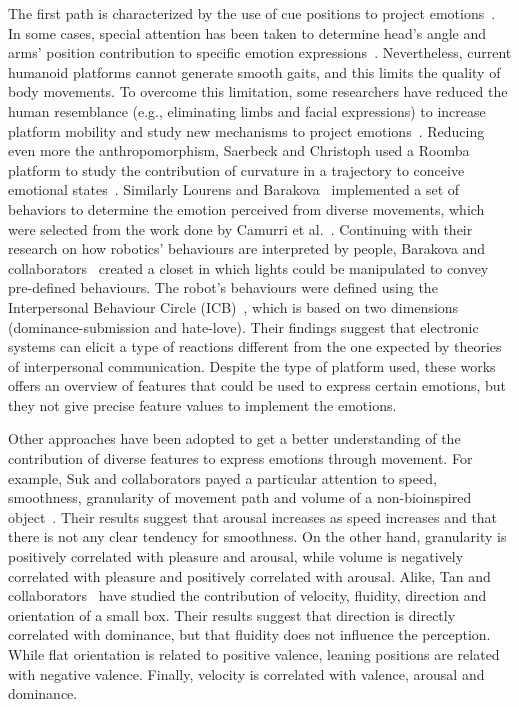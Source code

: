 The first path is characterized by the use of cue positions to project emotions~\cite{NAO2013}. In some cases, special attention has been taken to determine head's angle and arms' position contribution to specific emotion expressions~\cite{Brown2014}. 
Nevertheless, current humanoid platforms cannot generate smooth gaits, and this limits the quality of body movements. To overcome this limitation, some researchers have reduced the human resemblance (e.g., eliminating limbs and facial expressions) to increase platform mobility and study new mechanisms to project emotions~\cite{Arras2012}. Reducing even more the anthropomorphism, Saerbeck and Christoph used a Roomba platform to study the contribution of curvature in a trajectory to conceive emotional states~\cite{Saerbeck2010}. Similarly Lourens and Barakova~\cite{BarakovaL10} implemented a set of behaviors to determine the emotion  perceived from diverse movements, which were selected from the work done by Camurri et al.~\cite{pop00002}. Continuing with their research on how robotics' behaviours are interpreted by people, Barakova and collaborators~\cite{Barakova2013} created a closet in which lights could be manipulated to convey pre-defined behaviours. The robot's behaviours were defined using the Interpersonal Behaviour Circle (ICB)~\cite{Leary57}, which is based on two dimensions (dominance-submission and hate-love). Their findings suggest that electronic systems can elicit a type of reactions different from the one expected by theories of interpersonal communication. Despite the type of platform used, these works offers an overview of features that could be used to express certain emotions, but they not give precise feature values to implement the emotions.

Other approaches have been adopted to get a better understanding of the contribution of diverse features to express emotions through movement. For example, Suk and collaborators payed a particular attention to speed, smoothness, granularity of movement path and volume of a non-bioinspired object~\cite{NAM2014}. Their results suggest that arousal increases as speed increases and that there is not any clear tendency for smoothness. On the other hand, granularity is positively correlated with pleasure and arousal, while volume is negatively correlated with pleasure and positively correlated with arousal. Alike, Tan and collaborators~\cite{Tan2016} have studied the contribution of velocity, fluidity, direction and orientation of a small box. Their results suggest that direction is directly correlated with dominance, but that fluidity does not influence the perception. While flat orientation is related to positive valence, leaning positions are related with negative valence. Finally, velocity is correlated with valence, arousal and dominance.  

